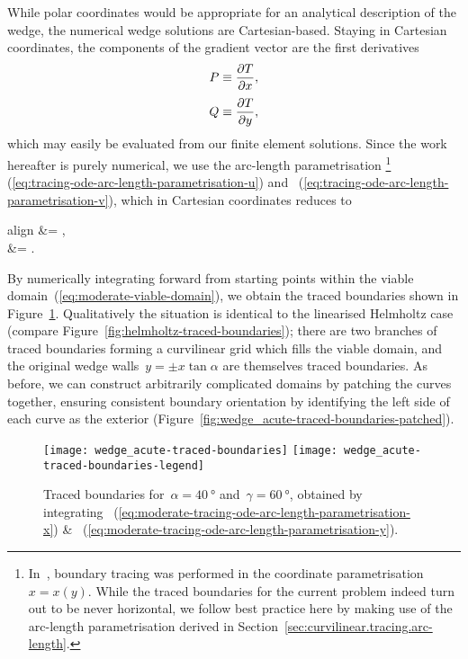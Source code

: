 While polar coordinates would be appropriate
for an analytical description of the wedge,
the numerical wedge solutions are Cartesian-based.
Staying in Cartesian coordinates,
the components of the gradient vector
are the first derivatives
\begin{align}
  P &\ideq \pder{T}{x},
    \label{eq:moderate-gradient-x-component} \\[\tallspace]
  Q &\ideq \pder{T}{y},
    \label{eq:moderate-gradient-y-component}
\end{align}
which may easily be evaluated from our finite element solutions.
Since the work hereafter is purely numerical,
we use the arc-length parametrisation%
\footnote{
  In~\cite{li-2017-thesis-rounding-capillary-wedge},
  boundary tracing was performed in the coordinate parametrisation~$x = x (y)$.
  While the traced boundaries for the current problem
  indeed turn out to be never horizontal,
  we follow best practice here
  by making use of the arc-length parametrisation
  derived in Section~\ref{sec:curvilinear.tracing.arc-length}.
}~%
  (\ref{eq:tracing-ode-arc-length-parametrisation-u})
and~%
  (\ref{eq:tracing-ode-arc-length-parametrisation-v}),
which in Cartesian coordinates reduces to
\begin{important}{align}
   &= ,
    \label{eq:moderate-tracing-ode-arc-length-parametrisation-x} \\[\tallspace]
   &= .
    \label{eq:moderate-tracing-ode-arc-length-parametrisation-y}
\end{important}
By numerically integrating forward from starting points
within the viable domain~(\ref{eq:moderate-viable-domain}),
we obtain the traced boundaries shown
in Figure~\ref{fig:wedge_acute-traced-boundaries}.
Qualitatively the situation is identical
to the linearised Helmholtz case
(compare Figure~\ref{fig:helmholtz-traced-boundaries});
there are two branches of traced boundaries
forming a curvilinear grid which fills the viable domain,
and the original wedge walls~$y = \pm x \tan\alpha$
are themselves traced boundaries.
As before, we can construct arbitrarily complicated domains
by patching the curves together,
ensuring consistent boundary orientation
by identifying the left side of each curve as the exterior
(Figure~\ref{fig:wedge_acute-traced-boundaries-patched}).

\begin{figure}
  \newcommand*{\legendoffsetheight}{0.34\textwidth}
  \centering
  \texttt{[image: wedge\_acute-traced-boundaries]}
  \texttt{[image: wedge\_acute-traced-boundaries-legend]}
  \caption{
    Traced boundaries for~$\alpha = \SI{40}{\degree}$
    and~$\gamma = \SI{60}{\degree}$,
    obtained by integrating~%
      (\ref{eq:moderate-tracing-ode-arc-length-parametrisation-x})
    \&~%
      (\ref{eq:moderate-tracing-ode-arc-length-parametrisation-y}).
  }
  \label{fig:wedge_acute-traced-boundaries}
\end{figure}

